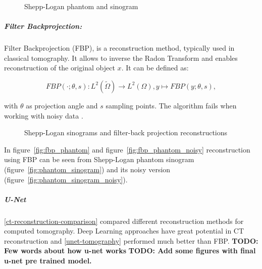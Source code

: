\begin{figure}[H]
    \label{fig:phantom_and_sinos}
    \hfill
    \hfill
    \hfill
    \hfill
	\caption{Shepp-Logan phantom and sinogram}
\end{figure}

\subparagraph{Filter Backprojection:}
Filter Backprojection \cite{tomographicReconstruction} (FBP), 
is a reconstruction method, typically used in classical tomography.
It allows to inverse the Radon Transform and enables reconstruction of the original object $x$.
It can be defined as:

\begin{equation}
    \label{eq:fbp}
    FBP(\cdot; \theta, s) : L^2(\tilde{\Omega}) \to L^2(\Omega), y \mapsto FBP(y; \theta, s) ,
\end{equation}

with $\theta$ as projection angle and $s$ sampling points. 
The algorithm fails when working with noisy data \cite{cryoEmMath2}.

\begin{figure}[H]
    \label{fig:phantom_fbps}
    \hfill
    \hfill
    \hfill
	\caption{Shepp-Logan sinograms and filter-back projection reconstructions}
\end{figure}

In figure~\ref{fig:fbp_phantom} and figure~\ref{fig:fbp_phantom_noisy} reconstruction using FBP can be seen from 
Shepp-Logan phantom sinogram (figure~\ref{fig:phantom_sinogram}) and its noisy version (figure~\ref{fig:phantom_sinogram_noisy}).

\subparagraph{U-Net}
\ref{ct-reconstruction-comparison} compared different reconstruction methods for computed tomography. 
Deep Learning approaches have great potential in CT reconstruction and \ref{unet-tomography} performed much better than FBP.
\textbf{TODO: Few words about how u-net works}
\textbf{TODO: Add some figures with final u-net pre trained model.}

